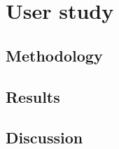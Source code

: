 \chapter{User study}  \label{chap_user_study}

\section{Methodology}

\section{Results}

\section{Discussion}